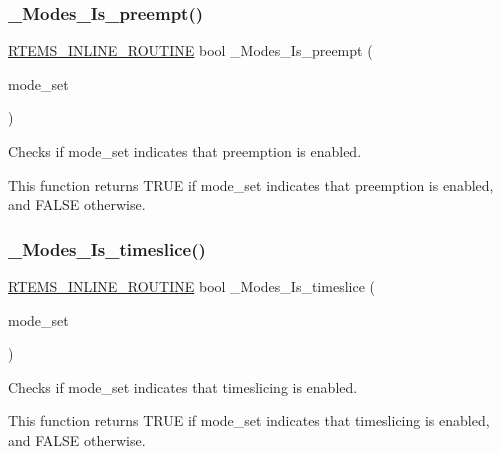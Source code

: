 \subsubsection{\texorpdfstring{\_Modes\_Is\_preempt()}{\_Modes\_Is\_preempt()}}
{\footnotesize\ttfamily \mbox{\hyperlink{group__RTEMSScoreBaseDefs_gac216239df231d5dbd15e3520b0b9313f}{R\+T\+E\+M\+S\+\_\+\+I\+N\+L\+I\+N\+E\+\_\+\+R\+O\+U\+T\+I\+NE}} bool \+\_\+\+Modes\+\_\+\+Is\+\_\+preempt (\begin{DoxyParamCaption}\item[{\mbox{\hyperlink{group__ClassicModes_ga8d46a41a837840dc97336fdcd20e4f68}{rtems\+\_\+mode}}}]{mode\+\_\+set }\end{DoxyParamCaption})}



Checks if mode\+\_\+set indicates that preemption is enabled. 

This function returns T\+R\+UE if mode\+\_\+set indicates that preemption is enabled, and F\+A\+L\+SE otherwise. \mbox{\label{group__ClassicModesImpl_ga38bf25bb20c0d19b57cf50c8d7af339c}} 
\subsubsection{\texorpdfstring{\_Modes\_Is\_timeslice()}{\_Modes\_Is\_timeslice()}}
{\footnotesize\ttfamily \mbox{\hyperlink{group__RTEMSScoreBaseDefs_gac216239df231d5dbd15e3520b0b9313f}{R\+T\+E\+M\+S\+\_\+\+I\+N\+L\+I\+N\+E\+\_\+\+R\+O\+U\+T\+I\+NE}} bool \+\_\+\+Modes\+\_\+\+Is\+\_\+timeslice (\begin{DoxyParamCaption}\item[{\mbox{\hyperlink{group__ClassicModes_ga8d46a41a837840dc97336fdcd20e4f68}{rtems\+\_\+mode}}}]{mode\+\_\+set }\end{DoxyParamCaption})}



Checks if mode\+\_\+set indicates that timeslicing is enabled. 

This function returns T\+R\+UE if mode\+\_\+set indicates that timeslicing is enabled, and F\+A\+L\+SE otherwise. \mbox{\label{group__ClassicModesImpl_ga08ded713046ba96e23768bd60beb334e}} 
